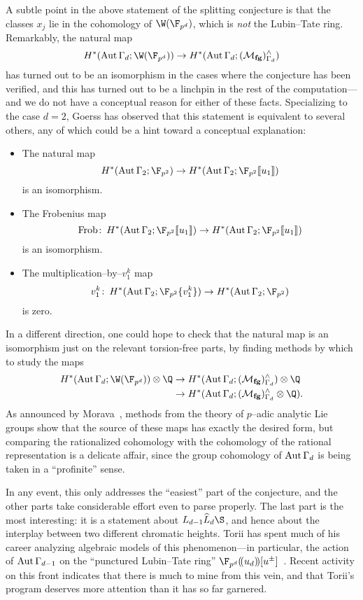 A subtle point in the above statement of the splitting conjecture is that the classes \(x_j\) lie in the cohomology of \(\W(\F_{p^d})\), which is \emph{not} the Lubin--Tate ring.  Remarkably, the natural map \[H^*(\Aut \Gamma_d; \W(\F_{p^d})) \to H^*(\Aut \Gamma_d; (\moduli{fg})^\wedge_{\Gamma_d})\] has turned out to be an isomorphism in the cases where the conjecture has been verified, and this has turned out to be a linchpin in the rest of the computation---and we do not have a conceptual reason for either of these facts.  Specializing to the case \(d = 2\), Goerss has observed that this statement is equivalent to several others, any of which could be a hint toward a conceptual explanation:
\begin{itemize}
    \item The natural map \[H^*(\Aut \Gamma_2; \F_{p^2}) \to H^*(\Aut \Gamma_2; \F_{p^2}\ps{u_1})\] is an isomorphism.
    \item The Frobenius map \[\Frob\co H^*(\Aut \Gamma_2; \F_{p^2}\ps{u_1}) \to H^*(\Aut \Gamma_2; \F_{p^2}\ps{u_1})\] is an isomorphism.
    \item The multiplication--by--\(v_1^k\) map \[v_1^k\co H^*(\Aut \Gamma_2; \F_{p^2}\{v_1^k\}) \to H^*(\Aut \Gamma_2; \F_{p^2})\] is zero.
\end{itemize}
In a different direction, one could hope to check that the natural map is an isomorphism just on the relevant torsion-free parts, by finding methods by which to study the maps
\begin{align*}
H^*(\Aut \Gamma_d; \W(\F_{p^d})) \otimes \Q & \to H^*(\Aut \Gamma_d; (\moduli{fg})^\wedge_{\Gamma_d}) \otimes \Q \\
& \to H^*(\Aut \Gamma_d; (\moduli{fg})^\wedge_{\Gamma_d} \otimes \Q).
\end{align*}
As announced by Morava~\cite[Remark 2.2.5]{MoravaCobordismComodules}, methods from the theory of \(p\)--adic analytic Lie groups show that the source of these maps has exactly the desired form, but comparing the rationalized cohomology with the cohomology of the rational representation is a delicate affair, since the group cohomology of \(\operatorname{Aut} \Gamma_d\) is being taken in a ``profinite'' sense.

In any event, this only addresses the ``easiest'' part of the conjecture, and the other parts take considerable effort even to parse properly.  The last part is the most interesting: it is a statement about \(L_{d-1} \widehat L_d \S\), and hence about the interplay between two different chromatic heights.  Torii has spent much of his career analyzing algebraic models of this phenomenon---in particular, the action of \(\operatorname{Aut} \Gamma_{d-1}\) on the ``punctured Lubin--Tate ring'' \(\F_{p^d}(\!(u_d)\!)[u^\pm]\)~\cite{Torii1,Torii2,Torii4,Torii3,Torii5}.  Recent activity on this front indicates that there is much to mine from this vein, and that Torii's program deserves more attention than it has so far garnered.

